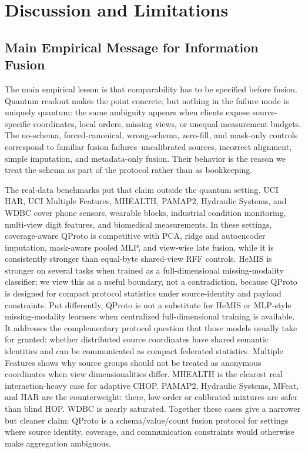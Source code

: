 \section{Discussion and Limitations}

\subsection{Main Empirical Message for Information Fusion}

The main empirical lesson is that comparability has to be specified before fusion. Quantum readout makes the point concrete, but nothing in the failure mode is uniquely quantum: the same ambiguity appears when clients expose source-specific coordinates, local orders, missing views, or unequal measurement budgets. The no-schema, forced-canonical, wrong-schema, zero-fill, and mask-only controls correspond to familiar fusion failures--uncalibrated sources, incorrect alignment, simple imputation, and metadata-only fusion. Their behavior is the reason we treat the schema as part of the protocol rather than as bookkeeping.

The real-data benchmarks put that claim outside the quantum setting. UCI HAR, UCI Multiple Features, MHEALTH, PAMAP2, Hydraulic Systems, and WDBC cover phone sensors, wearable blocks, industrial condition monitoring, multi-view digit features, and biomedical measurements. In these settings, coverage-aware QProto is competitive with PCA, ridge and autoencoder imputation, mask-aware pooled MLP, and view-wise late fusion, while it is consistently stronger than equal-byte shared-view RFF controls. HeMIS is stronger on several tasks when trained as a full-dimensional missing-modality classifier; we view this as a useful boundary, not a contradiction, because QProto is designed for compact protocol statistics under source-identity and payload constraints. Put differently, QProto is not a substitute for HeMIS or MLP-style missing-modality learners when centralized full-dimensional training is available. It addresses the complementary protocol question that those models usually take for granted: whether distributed source coordinates have shared semantic identities and can be communicated as compact federated statistics. Multiple Features shows why source groups should not be treated as anonymous coordinates when view dimensionalities differ. MHEALTH is the clearest real interaction-heavy case for adaptive CHOP. PAMAP2, Hydraulic Systems, MFeat, and HAR are the counterweight: there, low-order or calibrated mixtures are safer than blind HOP. WDBC is nearly saturated. Together these cases give a narrower but cleaner claim: QProto is a schema/value/count fusion protocol for settings where source identity, coverage, and communication constraints would otherwise make aggregation ambiguous.

